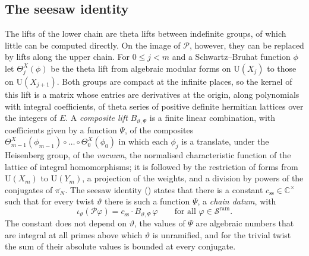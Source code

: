 \documentclass[10pt]{amsart}
\theoremstyle{definition}
\theoremstyle{remark}
\newcommand{\C}{\mathbb C}
\providecommand{\auP}{\mathcal P}
\providecommand{\auSram}{\mathcal S^{\mathrm{ram}}}
\providecommand{\auU}{\mathrm U}
\providecommand{\aubar}[1]{\overline{#1}}
\begin{document}
\subsection*{The seesaw identity}
The lifts of the lower chain are theta lifts between indefinite groups, of which little can be
computed directly. On the image of $\auP$, however, they can be replaced by lifts along the upper
chain. For $0\le j<m$ and a Schwartz--Bruhat function $\phi$ let $\Theta^X_j(\phi)$ be the theta
lift from algebraic modular forms on $\auU(X_j)$ to those on $\auU(X_{j+1})$. Both groups are
compact at the infinite places, so the kernel of this lift is a matrix whose entries are
derivatives at the origin, along polynomials with integral coefficients, of theta series of positive definite hermitian lattices over the
integers of $E$. A \emph{composite lift} $B_{\vartheta,\Psi}$ is a finite linear combination, with
coefficients given by a function $\Psi$, of the composites $\Theta^X_{m-1}(\phi_{m-1})\circ\dots
\circ\Theta^X_0(\phi_0)$ in which each $\phi_j$ is a translate, under the Heisenberg group, of the
\emph{vacuum}, the normalised characteristic function of the lattice of integral homomorphisms;
it is followed by the restriction of forms from $\auU(X_m)$ to $\auU(Y_m)$, a projection of the
weights, and a division by powers of the conjugates of $\aubar{\pi_N}$. The seesaw identity ({\cite[Proposition~14.19]{P46}}) states that there
is a constant $c_{\mathrm{ss}}\in\C^\times$ such that for every twist $\vartheta$ there is such a
function $\Psi$, a \emph{chain datum}, with
\begin{equation}\label{A1:eq-seesaw}
\iota_\vartheta(\auP\varphi)=c_{\mathrm{ss}}\cdot B_{\vartheta,\Psi}\,\varphi\qquad\text{for all }
\varphi\in\auSram .
\end{equation}
The constant does not depend on $\vartheta$, the values of $\Psi$ are algebraic numbers that are
integral at all primes above which $\vartheta$ is unramified, and for the trivial twist the sum of
their absolute values is bounded at every conjugate.
\end{document}

